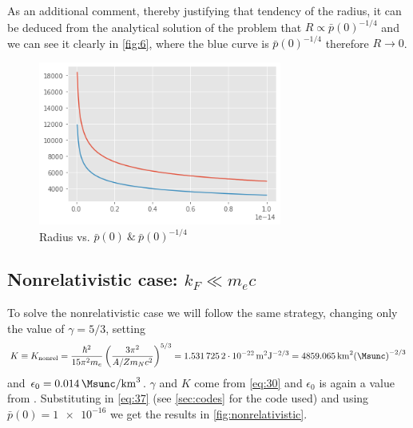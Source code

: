 \documentclass[a4paper]{article}
\begin{document}
As an additional comment, thereby justifying that tendency of the radius, it can be deduced from the analytical solution of the problem \cite{silbarNeutronStarsUndergraduates2004} that $R \propto \bar{p}(0)^{-1/4}$ and we can see it clearly in \autoref{fig:6}, where the blue curve is $\bar{p}(0)^{-1/4}$ therefore $R \to 0$.

\begin{figure}[h]
    \centering
    \includegraphics[width=8cm]{images/r-r^0.25-p0.png}
     \caption{Radius vs. $\bar{p}(0) ~\&~ \bar{p}(0)^{-1/4}$}
     \label{fig:6}
\end{figure}

\subsection[Nonrelativistic case]{Nonrelativistic case: $k_F \ll m_e c$} \label{subsec:solvingnonrel}

To solve the nonrelativistic case we will follow the same strategy, changing only the value of $\gamma = 5/3$, setting
\[K \equiv K_{\mathrm{nonrel}} = \frac{\hbar^2}{15 \pi ^2 m_e}\left(\frac{3\pi^2}{A/Zm_Nc^2}\right)^{5/3} = \qty{1.5317252e-22}{m^2 J^{-2/3}} = \qty{4859.065}{km^2 (\Msunc)^{-2/3}}\]
and $\epsilon_0 =\qty{0.014}{\Msunc/km^3}$. $\gamma$ and $K$ come from \eqref{eq:30} and $\epsilon_0$ is again a value from \cite{silbarNeutronStarsUndergraduates2004}. Substituting in \eqref{eq:37} (see \autoref{sec:codes} for the code used) and using $\bar{p}(0) = \num{1e-16}$ we get the results in \autoref{fig:nonrelativistic}.
\end{document}
